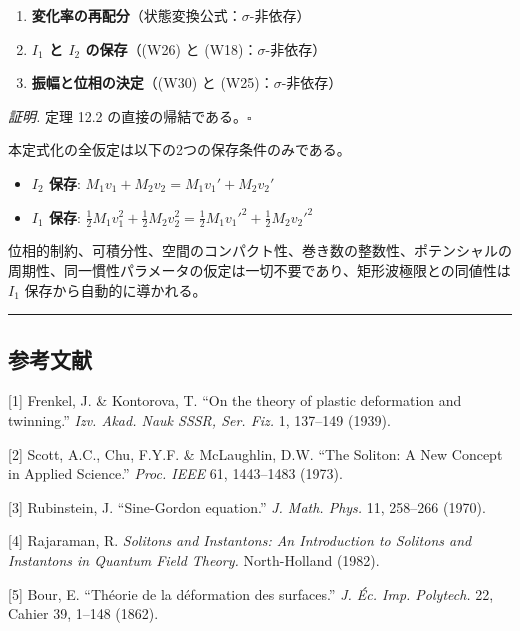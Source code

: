 \documentclass[a4paper,11pt]{ltjsarticle}
\providecommand{\tightlist}{\setlength{\itemsep}{0pt}\setlength{\parskip}{0pt}}
\begin{document}
\begin{enumerate}
\def\labelenumi{\arabic{enumi}.}
\tightlist
\item
  \textbf{変化率の再配分}（状態変換公式：\(\sigma\)-非依存）
\item
  \textbf{\(I_1\) と \(I_2\) の保存}（(W26) と
  (W18)：\(\sigma\)-非依存）
\item
  \textbf{振幅と位相の決定}（(W30) と (W25)：\(\sigma\)-非依存）
\end{enumerate}

\emph{証明.} 定理 12.2 の直接の帰結である。\(\square\)

本定式化の全仮定は以下の2つの保存条件のみである。

\begin{itemize}
\tightlist
\item
  \textbf{\(I_2\) 保存}: \(M_1 v_1 + M_2 v_2 = M_1 v_1' + M_2 v_2'\)
\item
  \textbf{\(I_1\) 保存}:
  \(\frac{1}{2}M_1 v_1^2 + \frac{1}{2}M_2 v_2^2 = \frac{1}{2}M_1 v_1'^2 + \frac{1}{2}M_2 v_2'^2\)
\end{itemize}

位相的制約、可積分性、空間のコンパクト性、巻き数の整数性、ポテンシャルの周期性、同一慣性パラメータの仮定は一切不要であり、矩形波極限との同値性は
\(I_1\) 保存から自動的に導かれる。

\begin{center}\rule{0.5\linewidth}{0.5pt}\end{center}

\subsection{参考文献}\label{ux53c2ux8003ux6587ux732e}

{[}1{]} Frenkel, J. \& Kontorova, T. ``On the theory of plastic
deformation and twinning.'' \emph{Izv. Akad. Nauk SSSR, Ser. Fiz.} 1,
137--149 (1939).

{[}2{]} Scott, A.C., Chu, F.Y.F. \& McLaughlin, D.W. ``The Soliton: A
New Concept in Applied Science.'' \emph{Proc. IEEE} 61, 1443--1483
(1973).

{[}3{]} Rubinstein, J. ``Sine-Gordon equation.'' \emph{J. Math. Phys.}
11, 258--266 (1970).

{[}4{]} Rajaraman, R. \emph{Solitons and Instantons: An Introduction to
Solitons and Instantons in Quantum Field Theory.} North-Holland (1982).

{[}5{]} Bour, E. ``Théorie de la déformation des surfaces.'' \emph{J.
Éc. Imp. Polytech.} 22, Cahier 39, 1--148 (1862).
\end{document}
